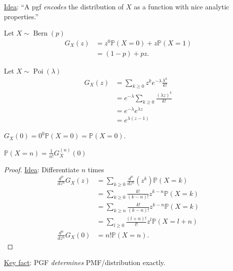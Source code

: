 \underline{Idea}: ``A pgf \emph{encodes} the distribution of $X$ as a function with nice analytic properties.''

\begin{example}[Bernoulli]
    Let $X \sim \operatorname{Bern}(p)$
    \begin{align*}
        G_X(z) &= z^0 \mathbb{P}(X = 0) + z \mathbb{P}(X = 1) \\
        &= (1-p) + pz.
    \end{align*} 
\end{example} 

\begin{example}[Poisson]
    Let $X \sim \operatorname{Poi}(\lambda)$
    \begin{align*}
        G_X(z) &= \sum_{k \geq 0} z^k e^{- \lambda} \frac{\lambda^k}{k!} \\
        &= e^{- \lambda} \sum_{k \geq 0} \frac{(\lambda z)^k}{k!} \\
        &= e^{- \lambda} e^{\lambda z} \\
        &= e^{\lambda (z - 1)}
    \end{align*} 
\end{example} 

\begin{note}
    $G_X(0) = 0^0 \mathbb{P}(X = 0) = \mathbb{P}(X = 0)$.
\end{note} 

\begin{proposition}
    $\mathbb{P}(X = n) = \frac{1}{n!} G_X^{(n)} (0)$
\end{proposition} 

\begin{proof}
    \underline{Idea}: Differentiate $n$ times
    \begin{align*}
        \frac{d^n}{d z^n} G_X(z) &= \sum_{k \geq 0} \frac{d^n}{d z^n} (z^k) \mathbb{P}(X = k) \\
        &= \sum_{k \geq 0} \frac{k!}{(k - n)!} z^{k - n} \mathbb{P}(X = k) \\
        &= \sum_{k \geq n} \frac{k!}{(k - n)!} z^{k - n} \mathbb{P}(X = k) \\
        &= \sum_{l \geq 0} \frac{(l + n)!}{l!} z^l \mathbb{P}(X = l + n) \\
        \frac{d^n}{d z^n} G_X(0) &= n! \mathbb{P}(X = n).
    \end{align*} 
\end{proof} 

\underline{Key fact}: PGF \emph{determines} PMF/distribution exactly.

